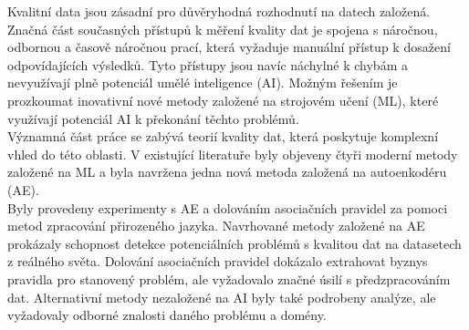 Kvalitní data jsou zásadní pro důvěryhodná rozhodnutí na datech založená. Značná část současných přístupů k měření kvality dat je spojena s náročnou, odbornou a časově náročnou prací, která vyžaduje manuální přístup k dosažení odpovídajících výsledků. Tyto přístupy jsou navíc náchylné k chybám a nevyužívají plně potenciál umělé inteligence (AI). Možným řešením je prozkoumat inovativní nové metody založené na strojovém učení (ML), které využívají potenciál AI k překonání těchto problémů.\\
\hspace*{5mm} Významná část práce se zabývá teorií kvality dat, která poskytuje komplexní vhled do této oblasti. V existující literatuře byly objeveny čtyři moderní metody založené na ML a byla navržena jedna nová metoda založená na autoenkodéru (AE).\\
\hspace*{5mm} Byly provedeny experimenty s AE a dolováním asociačních pravidel za pomoci metod zpracování přirozeného jazyka. Navrhované metody založené na AE prokázaly schopnost detekce potenciálních problémů s kvalitou dat na datasetech z reálného světa. Dolování asociačních pravidel dokázalo extrahovat byznys pravidla pro stanovený problém, ale vyžadovalo značné úsilí s předzpracováním dat. Alternativní metody nezaložené na AI byly také podrobeny analýze, ale vyžadovaly odborné znalosti daného problému a domény.
